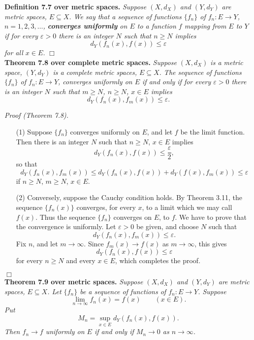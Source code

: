 \documentclass{article}
\begin{document}
\textbf{Definition 7.7 over metric spaces.}
\emph{Suppose $(X,d_X)$ and $(Y,d_Y)$ are metric spaces, $E \subseteq X$.
We say that a sequence of functions $\{f_n\}$ of $f_n: E \to Y$,
$n = 1,2,3,\ldots$,
\textbf{converges uniformly} on $E$ to a function $f$ mapping from $E$ to $Y$
if for every $\varepsilon > 0$ there is an integer $N$ such that $n \geq N$ implies
\[
  d_Y(f_n(x),f(x)) \leq \varepsilon
\]
for all $x \in E$.}
$\Box$ \\



\textbf{Theorem 7.8 over complete metric spaces.}
\emph{Suppose $(X,d_X)$ is a metric space,
$(Y,d_Y)$ is a complete metric spaces, $E \subseteq X$.
The sequence of functions $\{f_n\}$ of $f_n: E \to Y$,
converges uniformly on $E$ if and only if
for every $\varepsilon > 0$
there is an integer $N$ such that $m \geq N$, $n \geq N$, $x \in E$ implies}
\[
  d_Y(f_n(x),f_m(x)) \leq \varepsilon.
\]

\emph{Proof (Theorem 7.8).}
\begin{enumerate}
  \item[(1)]
  Suppose $\{f_n\}$ converges uniformly on $E$, and let $f$ be the limit function.
  Then there is an integer $N$ such that $n \geq N$, $x \in E$ implies
  \[
    d_Y(f_n(x),f(x)) \leq \frac{\varepsilon}{2},
  \]
  so that
  \[
    d_Y(f_n(x),f_m(x))
    \leq d_Y(f_n(x),f(x)) + d_Y(f(x),f_m(x))
    \leq \varepsilon
  \]
  if $n \geq N$, $m \geq N$, $x \in E$.

  \item[(2)]
  Conversely, suppose the Cauchy condition holds.
  By Theorem 3.11,
  the sequence $\{f_n(x)\}$ converges, for every $x$, to a limit which we may call $f(x)$.
  Thus the sequence $\{f_n\}$ converges on $E$, to $f$.
  We have to prove that the convergence is uniformly.
  Let $\varepsilon > 0$ be given, and choose $N$ such that
  \[
    d_Y(f_n(x),f_m(x)) \leq \varepsilon.
  \]
  Fix $n$, and let $m \to \infty$.
  Since $f_m(x) \to f(x)$ as $m \to \infty$, this gives
  \[
    d_Y(f_n(x),f(x)) \leq \varepsilon
  \]
  for every $n \geq N$ and every $x \in E$, which completes the proof.
\end{enumerate}
$\Box$ \\



\textbf{Theorem 7.9 over metric spaces.}
\emph{Suppose $(X,d_X)$ and $(Y,d_Y)$ are metric spaces, $E \subseteq X$.
Let $\{f_n\}$ be a sequence of functions of $f_n: E \to Y$.
Suppose
\[
  \lim_{n \to \infty}f_n(x) = f(x)
  \qquad
  (x \in E).
\]
Put
\[
  M_n = \sup_{x \in E} d_Y(f_n(x),f(x)).
\]
Then $f_n \to f$ uniformly on $E$ if and only if $M_n \to 0$ as $n \to \infty$.} \\
\end{document}
